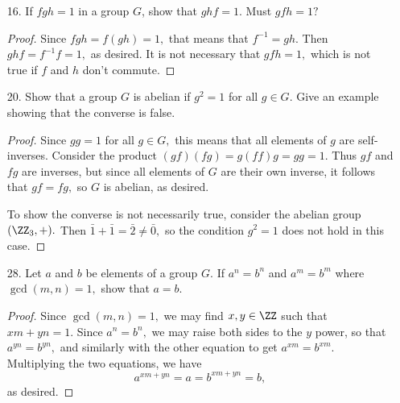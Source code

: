 \documentclass{article}
\begin{document}
\begin{itemize}
\begin{proof}
\begin{enumerate}
			\ii Every element of $G$ has an inverse in $G.$ Indeed, if $A$ is as before, then we can find its inverse $A^{-1}$ to be \[A^{-1} = \begin{bmatrix}
					1 & -a & ac-b \\
					0 & 1 & -c \\
					0 & 0 & 1
			\end{bmatrix}\] and $A^{-1}\in G$ as well.

		\end{enumerate} 
		Thus $G$ is a group, as desired.

	\end{proof}
		
	\item[16.] If $fgh=1$ in a group $G$, show that $ghf=1.$ Must $gfh=1?$
		\begin{proof}
			Since $fgh=f(gh)=1,$ that means that $f^{-1}=gh.$ Then $ghf=f^{-1}f=1,$ as desired. It is not necessary that $gfh=1,$ which is not true if $f$ and $h$ don't commute.
			
		\end{proof}

	\item[20.] Show that a group $G$ is abelian if $g^2=1$ for all $g\in G.$ Give an example showing that the converse is false.
		\begin{proof}
			Since $gg=1$ for all $g\in G,$ this means that all elements of $g$ are self-inverses. Consider the product $(gf)(fg)=g(ff)g=gg=1.$ Thus $gf$ and $fg$ are inverses, but since all elements of $G$ are their own inverse, it follows that $gf=fg,$ so $G$ is abelian, as desired.
			
			To show the converse is not necessarily true, consider the abelian group $(\ZZ_3, +).$ Then $\bar{1}+\bar{1}=\bar{2}\neq \bar{0},$ so the condition $g^2=1$ does not hold in this case.

		\end{proof}

	\item[28.] Let $a$ and $b$ be elements of a group $G.$ If $a^n=b^n$ and $a^m=b^m$ where $\gcd(m, n)=1,$ show that $a=b.$ 
		\begin{proof}
			Since $\gcd(m, n)=1,$ we may find $x, y\in\ZZ$ such that $xm+yn=1.$ Since $a^n=b^n,$ we may raise both sides to the $y$ power, so that $a^{yn}=b^{yn},$ and similarly with the other equation to get $a^{xm}=b^{xm}.$ Multiplying the two equations, we have \[a^{xm+yn} = a = b^{xm+yn}=b, \] as desired.

		\end{proof}

\end{itemize}
\end{document}
